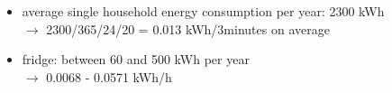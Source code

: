 


\begin{itemize}
    \item average single household energy consumption per year: 2300 kWh \\
    $\xrightarrow{}$ 2300/365/24/20 = 0.013 kWh/3minutes on average
    \item fridge: between 60 and 500 kWh per year\\
    $\xrightarrow{}$ 0.0068 - 0.0571 kWh/h
\end{itemize}